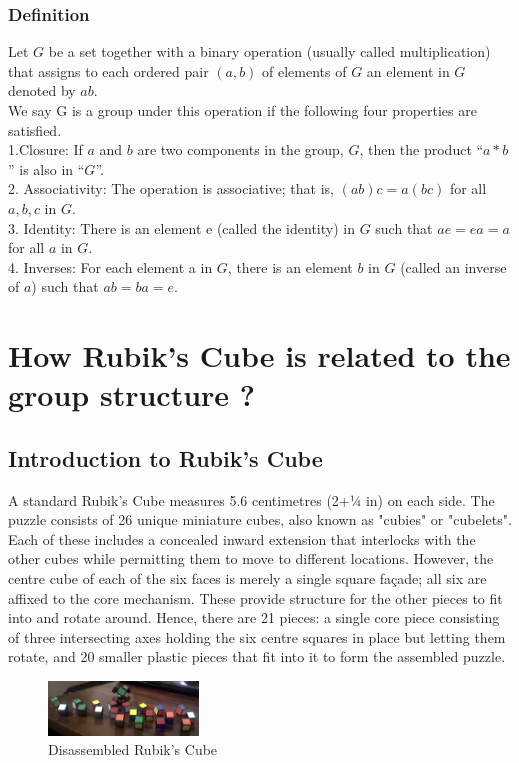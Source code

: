 \documentclass{article}
\begin{document}
\subsubsection{Definition}
Let $G$ be a set together with a binary operation (usually called multiplication) that assigns to each ordered pair $(a, b)$ of elements of $G$ an element in $G$ denoted by $ab$.\\ We say G is a group under this operation if the following four properties are satisfied.\\
1.Closure: If $a$ and $b$ are two components in the group, $G$, then the product “$a * b$” is also in “$G$”.\\
2. Associativity: The operation is associative; that is, $(ab)c = a(bc)$ for
all $a, b, c$ in $G$.\\
3. Identity: There is an element e (called the identity) in $G$ such that
$ae = ea = a$ for all $a$ in $G$.\\
4. Inverses: For each element a in $G$, there is an element $b$ in $G$ (called
an inverse of $a$) such that $ab = ba = e$.\cite{gallian2021contemporary}
\section{How Rubik's Cube is related to the group structure ?}
\subsection{Introduction to Rubik's Cube}
A standard Rubik's Cube measures 5.6 centimetres (2+1⁄4 in) on each side.\cite{ins} The puzzle consists of 26 unique miniature cubes, also known as "cubies" or "cubelets". Each of these includes a concealed inward extension that interlocks with the other cubes while permitting them to move to different locations. However, the centre cube of each of the six faces is merely a single square façade; all six are affixed to the core mechanism. These provide structure for the other pieces to fit into and rotate around. Hence, there are 21 pieces: a single core piece consisting of three intersecting axes holding the six centre squares in place but letting them rotate, and 20 smaller plastic pieces that fit into it to form the assembled puzzle.\cite{zeng2018overview}
\begin{figure}[h!]
    \centering
    \includegraphics[width=4cm]{Disassembled_Rubik's_Cube_on_table,_16_June_2013.png}
    \caption{Disassembled Rubik's Cube}
    \label{fig:Rubiks Cube}
\end{figure}
\end{document}
